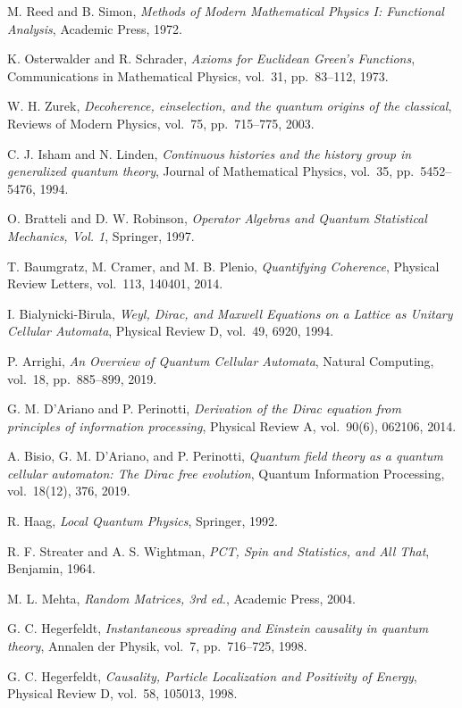 \documentclass[11pt]{article}
\theoremstyle{definition}
\theoremstyle{remark}
\begin{document}
\begin{thebibliography}{99}

M. Reed and B. Simon,
\textit{Methods of Modern Mathematical Physics I: Functional Analysis},
Academic Press, 1972.

K. Osterwalder and R. Schrader,
\textit{Axioms for Euclidean Green's Functions},
Communications in Mathematical Physics, vol.~31, pp.~83--112, 1973.

W. H. Zurek,
\textit{Decoherence, einselection, and the quantum origins of the classical},
Reviews of Modern Physics, vol.~75, pp.~715--775, 2003.

C. J. Isham and N. Linden,
\textit{Continuous histories and the history group in generalized quantum theory},
Journal of Mathematical Physics, vol.~35, pp.~5452--5476, 1994.

O. Bratteli and D. W. Robinson,
\textit{Operator Algebras and Quantum Statistical Mechanics, Vol. 1},
Springer, 1997.

T. Baumgratz, M. Cramer, and M. B. Plenio,
\textit{Quantifying Coherence},
Physical Review Letters, vol.~113, 140401, 2014.

I. Bialynicki-Birula,
\textit{Weyl, Dirac, and Maxwell Equations on a Lattice as Unitary Cellular Automata},
Physical Review D, vol.~49, 6920, 1994.

P. Arrighi,
\textit{An Overview of Quantum Cellular Automata},
Natural Computing, vol.~18, pp.~885--899, 2019.

G. M. D'Ariano and P. Perinotti,
\textit{Derivation of the Dirac equation from principles of information processing},
Physical Review A, vol.~90(6), 062106, 2014.

A. Bisio, G. M. D'Ariano, and P. Perinotti,
\textit{Quantum field theory as a quantum cellular automaton: The Dirac free evolution},
Quantum Information Processing, vol.~18(12), 376, 2019.

R. Haag,
\textit{Local Quantum Physics},
Springer, 1992.

R. F. Streater and A. S. Wightman,
\textit{PCT, Spin and Statistics, and All That},
Benjamin, 1964.

M. L. Mehta,
\textit{Random Matrices, 3rd ed.},
Academic Press, 2004.

G. C. Hegerfeldt,
\textit{Instantaneous spreading and Einstein causality in quantum theory},
Annalen der Physik, vol.~7, pp.~716--725, 1998.

G. C. Hegerfeldt,
\textit{Causality, Particle Localization and Positivity of Energy},
Physical Review D, vol.~58, 105013, 1998.

\end{thebibliography}
\end{document}
